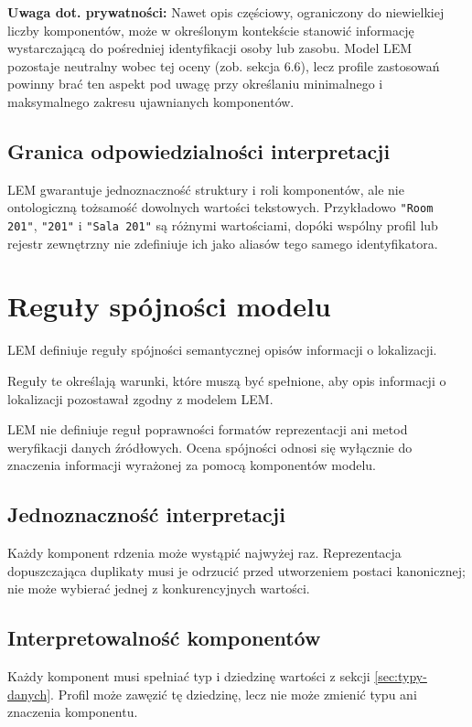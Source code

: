 \noindent \textbf{Uwaga dot. prywatności:} Nawet opis częściowy, ograniczony do niewielkiej liczby komponentów, może w określonym kontekście stanowić informację wystarczającą do pośredniej identyfikacji osoby lub zasobu. Model LEM pozostaje neutralny wobec tej oceny (zob. sekcja 6.6), lecz profile zastosowań powinny brać ten aspekt pod uwagę przy określaniu minimalnego i maksymalnego zakresu ujawnianych komponentów.

\subsection{Granica odpowiedzialności interpretacji}
\label{sec:kanoniczna-pojecie}
LEM gwarantuje jednoznaczność struktury i roli komponentów, ale nie ontologiczną tożsamość dowolnych wartości tekstowych. Przykładowo \texttt{"Room 201"}, \texttt{"201"} i \texttt{"Sala 201"} są różnymi wartościami, dopóki wspólny profil lub rejestr zewnętrzny nie zdefiniuje ich jako aliasów tego samego identyfikatora.

\section{Reguły spójności modelu}
\label{sec:spojnosci-modelu}
LEM definiuje reguły spójności semantycznej opisów informacji o lokalizacji.

Reguły te określają warunki, które muszą być spełnione, aby opis informacji o lokalizacji pozostawał zgodny z modelem LEM.

LEM nie definiuje reguł poprawności formatów reprezentacji ani metod weryfikacji danych źródłowych. Ocena spójności odnosi się wyłącznie do znaczenia informacji wyrażonej za pomocą komponentów modelu.

\subsection{Jednoznaczność interpretacji}
\label{sec:jednoznacznosc}
Każdy komponent rdzenia może wystąpić najwyżej raz. Reprezentacja dopuszczająca duplikaty musi je odrzucić przed utworzeniem postaci kanonicznej; nie może wybierać jednej z konkurencyjnych wartości.

\subsection{Interpretowalność komponentów}
\label{sec:interpretowalnosc}
Każdy komponent musi spełniać typ i dziedzinę wartości z sekcji \ref{sec:typy-danych}. Profil może zawęzić tę dziedzinę, lecz nie może zmienić typu ani znaczenia komponentu.

